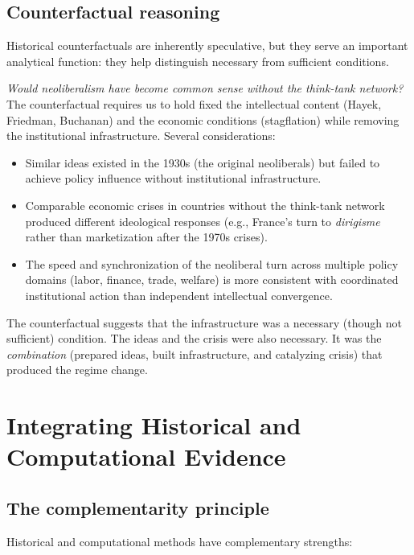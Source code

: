 \subsection{Counterfactual reasoning}

Historical counterfactuals are inherently speculative, but they serve an important analytical function: they help distinguish necessary from sufficient conditions.

\begin{example}
\label{ex:counterfactual}
\emph{Would neoliberalism have become common sense without the think-tank network?}
The counterfactual requires us to hold fixed the intellectual content (Hayek, Friedman, Buchanan) and the economic conditions (stagflation) while removing the institutional infrastructure.
Several considerations:
\begin{itemize}[nosep]
  \item Similar ideas existed in the 1930s (the original neoliberals) but failed to achieve policy influence without institutional infrastructure.
  \item Comparable economic crises in countries without the think-tank network produced different ideological responses (e.g., France's turn to \emph{dirigisme} rather than marketization after the 1970s crises).
  \item The speed and synchronization of the neoliberal turn across multiple policy domains (labor, finance, trade, welfare) is more consistent with coordinated institutional action than independent intellectual convergence.
\end{itemize}
The counterfactual suggests that the infrastructure was a necessary (though not sufficient) condition.
The ideas and the crisis were also necessary.
It was the \emph{combination} (prepared ideas, built infrastructure, and catalyzing crisis) that produced the regime change.
\end{example}

\section{Integrating Historical and Computational Evidence}
\label{sec:ch18-integration}

\subsection{The complementarity principle}

Historical and computational methods have complementary strengths:

